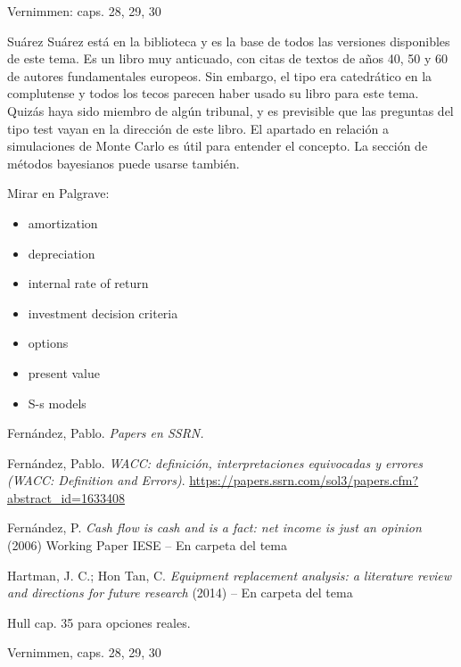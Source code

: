 \documentclass{nuevotema}
\begin{document}
\bibliografia

Vernimmen: caps. 28, 29, 30

Suárez Suárez está en la biblioteca y es la base de todos las versiones disponibles de este tema. Es un libro muy anticuado, con citas de textos de años 40, 50 y 60 de autores fundamentales europeos. Sin embargo, el tipo era catedrático en la complutense y todos los tecos parecen haber usado su libro para este tema. Quizás haya sido miembro de algún tribunal, y es previsible que las preguntas del tipo test vayan en la dirección de este libro. El apartado en relación a simulaciones de Monte Carlo es útil para entender el concepto. La sección de métodos bayesianos puede usarse también.

Mirar en Palgrave:
\begin{itemize}
    \item amortization
    \item depreciation
    \item internal rate of return
    \item investment decision criteria
    \item options
    \item present value
    \item S-s models
\end{itemize}




Fernández, Pablo. \textit{Papers en SSRN.}

Fernández, Pablo. \textit{WACC: definición, interpretaciones equivocadas y errores (WACC: Definition and Errors)}. \url{https://papers.ssrn.com/sol3/papers.cfm?abstract_id=1633408}

Fernández, P. \textit{Cash flow is cash and is a fact: net income is just an opinion} (2006) Working Paper IESE -- En carpeta del tema

Hartman, J. C.; Hon Tan, C. \textit{Equipment replacement analysis: a literature review and directions for future research} (2014) -- En carpeta del tema

Hull cap. 35 para opciones reales.

Vernimmen, caps. 28, 29, 30
\end{document}
